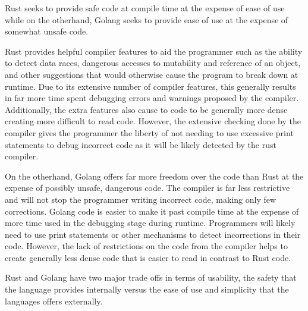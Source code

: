 Rust seeks to provide safe code at compile time at the expense of ease of use while on the otherhand, Golang seeks to provide ease of use at the expense of somewhat unsafe code. 

Rust provides helpful compiler features to aid the programmer such as the ability to detect data races, dangerous accesses to mutability and reference of an object, and other suggestions that would otherwise cause the program to break down at runtime. Due to its extensive number of compiler features, this generally results in far more time spent debugging errors and warnings proposed by the compiler. Additionally, the extra features also cause to code to be generally more dense creating more difficult to read code. However, the extensive checking done by the compiler gives the programmer the liberty of not needing to use excessive print statements to debug incorrect code as it will be likely detected by the rust compiler.

On the otherhand, Golang offers far more freedom over the code than Rust at the expense of possibly unsafe, dangerous code. The compiler is far less restrictive and will not stop the programmer writing incorrect code, making only few corrections. Golang code is easier to make it past compile time at the expense of more time used in the debugging stage during runtime. Programmers will likely need to use print statements or other mechanisms to detect incorrections in their code. However, the lack of restrictions on the code from the compiler helps to create generally less dense code that is easier to read in contrast to Rust code.

Rust and Golang have two major trade offs in terms of usability, the safety that the language provides internally versus the ease of use and simplicity that the languages offers externally.

